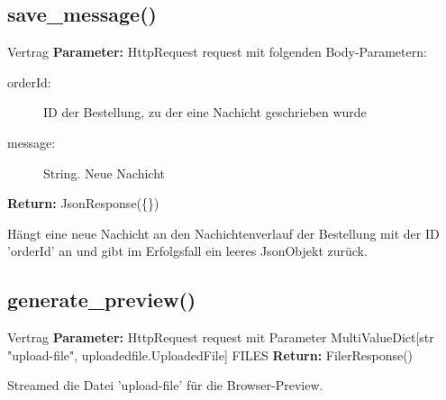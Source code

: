\documentclass[12pt]{article}
\newcommand{\insetContract}{12pt}
\newcommand{\insetMethodDescription}{-0.7cm}
\begin{document}
\subsection{save_message()}
\begin{contract}{Vertrag}
    \textbf{Parameter:} HttpRequest request mit folgenden Body-Parametern:
    \begin{description}
        \item[\hspace{\insetContract} orderId:] ID der Bestellung, zu der eine Nachicht geschrieben wurde
        \item[\hspace{\insetContract} message:] String. Neue Nachicht
    \end{description}
    \textbf{Return:} JsonResponse(\{\})
\end{contract}
\hspace{\insetMethodDescription{}}
Hängt eine neue Nachicht an den Nachichtenverlauf der Bestellung mit der ID 'orderId' an und gibt im Erfolgsfall ein leeres JsonObjekt zurück.


\subsection{generate_preview()}
\begin{contract}{Vertrag}
    \textbf{Parameter:} HttpRequest request mit Parameter MultiValueDict[str "upload-file", uploadedfile.UploadedFile] FILES
    \textbf{Return:} FilerResponse() 
\end{contract}
\hspace{\insetMethodDescription{}}
Streamed die Datei 'upload-file' für die Browser-Preview.
\end{document}
